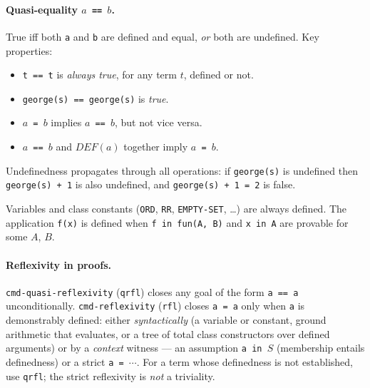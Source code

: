 \paragraph{Quasi-equality \texttt{$a$ == $b$}.}
True iff both \texttt{a} and \texttt{b} are defined and equal, \emph{or}
both are undefined.  Key properties:
\begin{itemize}
\item \texttt{t == t} is \emph{always true}, for any term $t$,
  defined or not.
\item \texttt{george(s) == george(s)} is \emph{true}.
\item \texttt{$a$ = $b$} implies \texttt{$a$ == $b$}, but not vice versa.
\item \texttt{$a$ == $b$} and $\mathit{DEF}(a)$ together imply
  \texttt{$a$ = $b$}.
\end{itemize}

\noindent
Undefinedness propagates through all operations: if \texttt{george(s)}
is undefined then \texttt{george(s) + 1} is also undefined,
and \texttt{george(s) + 1 = 2} is false.

Variables and class constants (\texttt{ORD}, \texttt{RR},
\texttt{EMPTY-SET}, \ldots) are always defined.  The application
\texttt{f(x)} is defined when \texttt{f in fun(A, B)} and
\texttt{x in A} are provable for some $A$, $B$.

\paragraph{Reflexivity in proofs.}
\texttt{cmd-quasi-reflexivity} (\texttt{qrfl}) closes any goal of the form
\texttt{a == a} unconditionally.
\texttt{cmd-reflexivity} (\texttt{rfl}) closes \texttt{a = a} only when
\texttt{a} is demonstrably defined: either \emph{syntactically} (a variable
or constant, ground arithmetic that evaluates, or a tree of total class
constructors over defined arguments) or by a \emph{context} witness --- an
assumption \texttt{a in $S$} (membership entails definedness) or a strict
\texttt{a = $\cdots$}.  For a term whose definedness is not established, use
\texttt{qrfl}; the strict reflexivity is \emph{not} a triviality.

